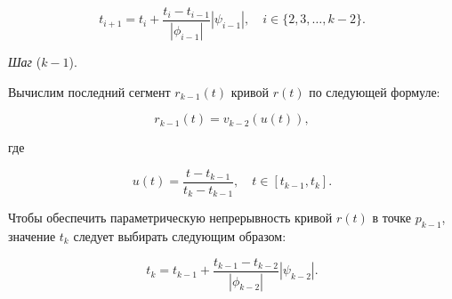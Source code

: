 $$
t_{i+1}=t_i+\frac{t_i-t_{i-1}}{|\phi_{i-1}|}|\psi_{i-1}|, \quad i \in \{2,3,\dots,k-2\}.
$$

\bigskip
\textit{Шаг} ($k-1$).

Вычислим последний сегмент $r_{k-1}(t)$ кривой $r(t)$ по следующей формуле:

$$
r_{k-1}(t)=v_{k-2}(u(t)),
$$

\noindent где

$$
u(t)=\frac{t-t_{k-1}}{t_k-t_{k-1}}, \quad t \in [t_{k-1},t_k].
$$

Чтобы обеспечить параметрическую непрерывность кривой $r(t)$ в точке $p_{k-1}$, значение $t_k$ следует выбирать
следующим образом:

$$
t_k=t_{k-1}+\frac{t_{k-1}-t_{k-2}}{|\phi_{k-2}|}|\psi_{k-2}|.
$$
